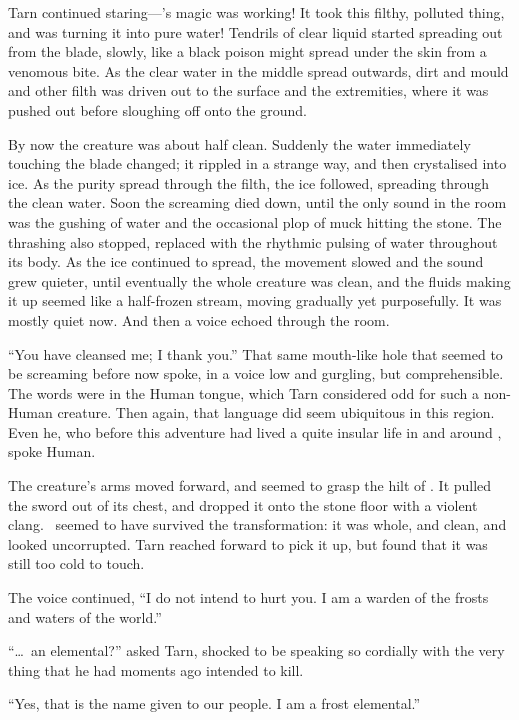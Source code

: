 Tarn continued staring---\kildir's magic was working!  It took this filthy, polluted thing, and was turning it into pure water!  Tendrils of clear liquid started spreading out from the blade, slowly, like a black poison might spread under the skin from a venomous bite.  As the clear water in the middle spread outwards, dirt and mould and other filth was driven out to the surface and the extremities, where it was pushed out before sloughing off onto the ground.

By now the creature was about half clean.  Suddenly the water immediately touching the blade changed; it rippled in a strange way, and then crystalised into ice.  As the purity spread through the filth, the ice followed, spreading through the clean water.  Soon the screaming died down, until the only sound in the room was the gushing of water and the occasional plop of muck hitting the stone.  The thrashing also stopped, replaced with the rhythmic pulsing of water throughout its body.  As the ice continued to spread, the movement slowed and the sound grew quieter, until eventually the whole creature was clean, and the fluids making it up seemed like a half-frozen stream, moving gradually yet purposefully.  It was mostly quiet now.  And then a voice echoed through the room.

``You have cleansed me; I thank you.''  That same mouth-like hole that seemed to be screaming before now spoke, in a voice low and gurgling, but comprehensible.  The words were in the Human tongue, which Tarn considered odd for such a non-Human creature.  Then again, that language did seem ubiquitous in this region.  Even he, who before this adventure had lived a quite insular life in and around \korbarthrond, spoke Human.

The creature's arms moved forward, and seemed to grasp the hilt of \kildir.  It pulled the sword out of its chest, and dropped it onto the stone floor with a violent clang.  \kildir\ seemed to have survived the transformation: it was whole, and clean, and looked uncorrupted.  Tarn reached forward to pick it up, but found that it was still too cold to touch.

The voice continued, ``I do not intend to hurt you.  I am a warden of the frosts and waters of the world.''

``\ldots\ an elemental?'' asked Tarn, shocked to be speaking so cordially with the very thing that he had moments ago intended to kill.

``Yes, that is the name given to our people.  I am a frost elemental.''

